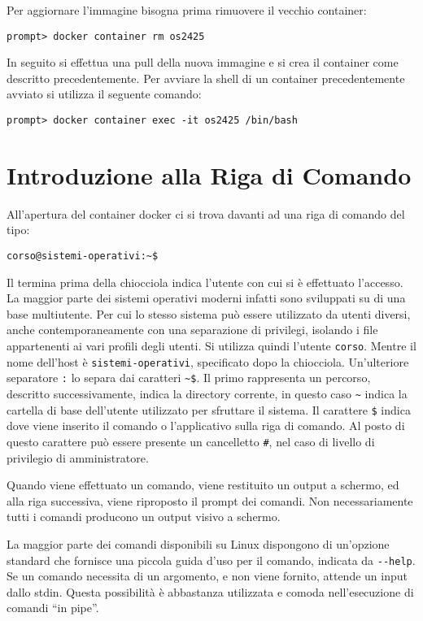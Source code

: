 \documentclass{article}
\numberwithin{equation}{subsection}
\begin{document}
Per aggiornare l'immagine bisogna prima rimuovere il vecchio container:
\begin{verbatim}
prompt> docker container rm os2425
\end{verbatim}
In seguito si effettua una pull della nuova immagine e si crea il container come descritto precedentemente. Per avviare la shell di un container precedentemente avviato si utilizza il 
seguente comando:
\begin{verbatim}
prompt> docker container exec -it os2425 /bin/bash
\end{verbatim}

\clearpage

\section{Introduzione alla Riga di Comando}

All'apertura del container docker ci si trova davanti ad una riga di comando del tipo:
\begin{verbatim}
corso@sistemi-operativi:~$    
\end{verbatim}
Il termina prima della chiocciola indica l'utente con cui si è effettuato l'accesso. La maggior parte dei sistemi operativi moderni infatti sono sviluppati su di una base multiutente. Per cui lo stesso sistema può 
essere utilizzato da utenti diversi, anche contemporaneamente con una separazione di privilegi, isolando i file appartenenti ai vari profili degli utenti. Si utilizza quindi l'utente \verb|corso|. Mentre il nome 
dell'host è \verb|sistemi-operativi|, specificato dopo la chiocciola. Un'ulteriore separatore \verb|:| lo separa dai caratteri \verb|~$|. Il primo rappresenta un percorso, descritto successivamente, indica 
la directory corrente, in questo caso \verb|~| indica la cartella di base dell'utente utilizzato per sfruttare il sistema. Il carattere \verb|$| indica dove viene inserito il comando o l'applicativo sulla riga 
di comando. Al posto di questo carattere può essere presente un cancelletto \verb|#|, nel caso di livello di privilegio di amministratore. 

Quando viene effettuato un comando, viene restituito un output a schermo, ed alla riga successiva, viene riproposto il prompt dei comandi. Non necessariamente tutti i comandi producono un output visivo a schermo. 

La maggior parte dei comandi disponibili su Linux dispongono di un'opzione standard che fornisce una piccola guida d'uso per il comando, indicata da \verb|--help|. 
Se un comando necessita di un argomento, e non viene fornito, attende un input dallo stdin. Questa possibilità è abbastanza utilizzata e comoda nell'esecuzione di comandi ``in pipe''. 
\end{document}

